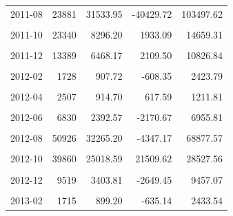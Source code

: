 \begin{longtable}[t]{crrrr}
2011-08 & 23881 & 31533.95 & -40429.72 & 103497.62\\
\cellcolor{gray!10}{2011-09} & \cellcolor{gray!10}{55031} & \cellcolor{gray!10}{29585.79} & \cellcolor{gray!10}{236.27} & \cellcolor{gray!10}{58935.31}\\
2011-10 & 23340 & 8296.20 & 1933.09 & 14659.31\\
\cellcolor{gray!10}{2011-11} & \cellcolor{gray!10}{18541} & \cellcolor{gray!10}{8781.60} & \cellcolor{gray!10}{-14048.07} & \cellcolor{gray!10}{31611.26}\\
2011-12 & 13389 & 6468.17 & 2109.50 & 10826.84\\
\cellcolor{gray!10}{2012-01} & \cellcolor{gray!10}{2978} & \cellcolor{gray!10}{1092.72} & \cellcolor{gray!10}{-251.45} & \cellcolor{gray!10}{2436.90}\\
2012-02 & 1728 & 907.72 & -608.35 & 2423.79\\
\cellcolor{gray!10}{2012-03} & \cellcolor{gray!10}{2509} & \cellcolor{gray!10}{1108.66} & \cellcolor{gray!10}{437.85} & \cellcolor{gray!10}{1779.47}\\
2012-04 & 2507 & 914.70 & 617.59 & 1211.81\\
\cellcolor{gray!10}{2012-05} & \cellcolor{gray!10}{3987} & \cellcolor{gray!10}{1428.07} & \cellcolor{gray!10}{331.30} & \cellcolor{gray!10}{2524.84}\\
2012-06 & 6830 & 2392.57 & -2170.67 & 6955.81\\
\cellcolor{gray!10}{2012-07} & \cellcolor{gray!10}{14868} & \cellcolor{gray!10}{6142.60} & \cellcolor{gray!10}{90.76} & \cellcolor{gray!10}{12194.45}\\
2012-08 & 50926 & 32265.20 & -4347.17 & 68877.57\\
\cellcolor{gray!10}{2012-09} & \cellcolor{gray!10}{63408} & \cellcolor{gray!10}{34953.97} & \cellcolor{gray!10}{10652.62} & \cellcolor{gray!10}{59255.32}\\
2012-10 & 39860 & 25018.59 & 21509.62 & 28527.56\\
\cellcolor{gray!10}{2012-11} & \cellcolor{gray!10}{18114} & \cellcolor{gray!10}{8409.81} & \cellcolor{gray!10}{-14916.25} & \cellcolor{gray!10}{31735.86}\\
2012-12 & 9519 & 3403.81 & -2649.45 & 9457.07\\
\cellcolor{gray!10}{2013-01} & \cellcolor{gray!10}{2544} & \cellcolor{gray!10}{794.03} & \cellcolor{gray!10}{-744.40} & \cellcolor{gray!10}{2332.45}\\
2013-02 & 1715 & 899.20 & -635.14 & 2433.54\\

\end{longtable}
